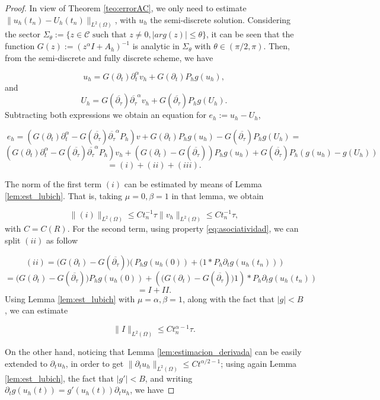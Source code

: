 \documentclass{amsart}
\newcommand{\ele}{L^2(\Omega)}
\newcommand{\W}{\Omega}
\newcommand{\fmonio}{g}
\theoremstyle{remark}
\theoremstyle{definition}
\numberwithin{equation}{section}
\begin{document}
\begin{proof}
In view of Theorem \ref{teo:errorAC}, we only need to  estimate  $\|u_h(t_n) - U_h(t_n)\|_{L^2(\W)}$, with $u_h$ the semi-discrete solution. Considering the sector $\Sigma_{\theta} := \{ z \in \mathcal{C} \text{ such that } z \not = 0, |arg(z)| \leq \theta \}$, it can be seen that the function $G(z) := (z^{\alpha}I + A_h)^{-1}$ is analytic in $\Sigma_{\theta}$ with $\theta \in (\pi/2 , \pi)$. Then, from the semi-discrete and fully discrete scheme, we have

$$u_h = G(\partial_t) \partial_t^{\alpha}v_h + G(\partial_t)P_h\fmonio(u_h), $$ 
and 
$$U_h = G(\overline{\partial_{\tau}}) \overline{\partial_{\tau}}^{\alpha}v_h + G(\overline{\partial_{\tau}})P_h\fmonio(U_h).$$
Subtracting both expressions we obtain an equation for $e_h := u_h - U_h$, 

\begin{equation}
\label{eq:error_formula}
e_h = (G(\partial_t) \partial_t^{\alpha} - G(\overline{\partial_{\tau}}) \overline{\partial_{\tau}}^{\alpha}P_h)v + G(\partial_t)P_h\fmonio(u_h)
 - G(\overline{\partial_{\tau}})P_h\fmonio(U_h) = 
\end{equation}
$$(G(\partial_t) \partial_t^{\alpha} - G(\overline{\partial_{\tau}}) \overline{\partial_{\tau}}^{\alpha}P_h)v_h + 
(G(\partial_t) - G(\overline{\partial_{\tau}}) )P_h\fmonio(u_h) 
 + G(\overline{\partial_{\tau}})P_h(\fmonio(u_h)-\fmonio(U_h))
$$
$$= (i) + (ii) + (iii).$$

The norm of the first term $(i)$ can be estimated by means of Lemma \ref{lem:est_lubich}. That is, taking $\mu = 0, \beta = 1$ in that lemma, we obtain

$$\|(i)\|_{L^2(\W)} \leq Ct_n^{-1}\tau\|v_h\|_{\ele} \leq Ct_n^{-1}\tau,$$
with $C = C(R)$. For the second term, using property \eqref{eq:asociatividad}, we can split $(ii)$ as follow 

$$(ii) = \big(G(\partial_t) - G(\overline{\partial_{\tau}}) \big)\big(\, P_h\fmonio(u_h(0)) + (1*P_h\partial_t\fmonio(u_h(t_n))\,\big)  $$
$$
= \big(G(\partial_t) - G(\overline{\partial_{\tau}}) \big)P_h\fmonio(u_h(0)) + (\big(G(\partial_t) - G(\overline{\partial_{\tau}}) \big)1)*P_h\partial_t\fmonio(u_h(t_n))
$$
$$
= I + II.
$$
Using Lemma \ref{lem:est_lubich} with $\mu = \alpha, \beta =1$, along with the fact that $|\fmonio| < B$, we can estimate 

$$\|I\|_{\ele} \leq Ct_n^{\alpha-1}\tau.$$

On the other hand, noticing that Lemma \ref{lem:estimacion_derivada} can be easily extended to $\partial_t u_h$, in order to get $\|\partial_t u_h\|_{\ele} \leq C t^{\alpha/2 -1}$; using again Lemma \ref{lem:est_lubich}, the fact that $|\fmonio'|<B$, and writing $\partial_t \fmonio(u_h(t)) = \fmonio'(u_h(t))\partial_t u_h$, we have 


\end{proof}
\end{document}
